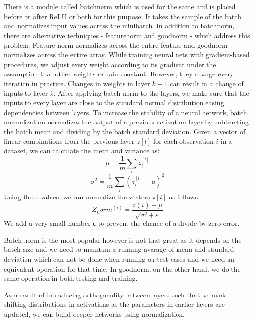 There is a module called batchnorm which is used for the same and is placed before or after ReLU or both for this purpose. 
It takes the sample of the batch and normalizes input values across the minibatch. 
In addition to batchnorm, there are alternative techniques - featurenorm and goodnorm - which address this problem. 
Feature norm normalizes across the entire feature and goodnorm normalizes across the entire array.
While training neural nets with gradient-based procedures, we adjust every weight according to its gradient under the assumption that other weights remain constant. 
However, they change every iteration in practice. Changes in weights in layer $k-1$ can result in a change of inputs to layer $k$. 
After applying batch norm to the layers, we make sure that the inputs to every layer are close to the standard normal distribution easing dependencies between layers. 
To increase the stability of a neural network, batch normalization normalizes the output of a previous activation layer by subtracting the batch mean and dividing by the batch standard deviation. 
Given a vector of linear combinations from the previous layer $z[l]$ for each observation $i$ in a dataset, we can calculate the mean and variance as: 
\begin{equation}
    \mu = \frac{1}{m} \sum_i z_i^{[l]}
\end{equation}
\begin{equation}
    \sigma^2 = \frac{1}{m} \sum_i (z_i^{[l]} - \mu)^2
\end{equation}
Using these values, we can normalize the vectors $z[l]$ as follows.
\begin{equation}
    Z_norm^(i) = \dfrac{z(i) - \mu}{\sqrt{\sigma^2+\varepsilon}}
\end{equation}
We add a very small number ϵ to prevent the chance of a divide by zero error.

Batch norm is the most popular however is not that great as it depends on the batch size and we need to maintain a running average of mean and standard deviation which can not be done when running on test cases and we need an equivalent operation for that time. 
In goodnorm, on the other hand, we do the same operation in both testing and training. 

As a result of introducing orthogonality between layers such that we avoid shifting distributions in activations as the parameters in earlier layers are updated, we can build deeper networks using normalization.

